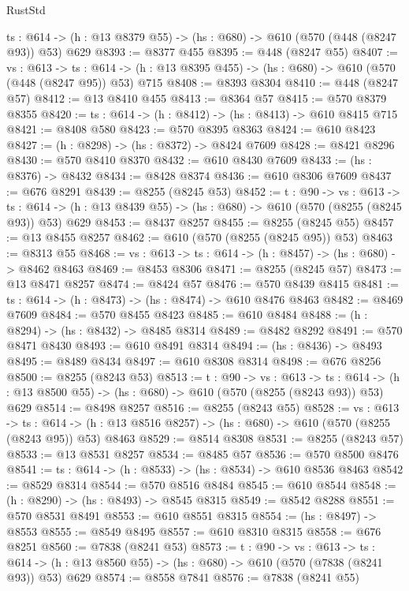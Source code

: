\begin{lexlean}{RustStd}
\begin{coremodule}
  {ts : @614} -> (h : @13 @8379 @55) -> (hs : @680) -> @610 (@570 (@448 (@8247 @93)) @53) @629
@8393 := @8377 @455
@8395 := @448 (@8247 @55)
@8407 := {vs : @613} ->
  {ts : @614} -> (h : @13 @8395 @455) -> (hs : @680) -> @610 (@570 (@448 (@8247 @95)) @53) @715
@8408 := @8393 @8304
@8410 := @448 (@8247 @57)
@8412 := @13 @8410 @455
@8413 := @8364 @57
@8415 := @570 @8379 @8355
@8420 := {ts : @614} -> (h : @8412) -> (hs : @8413) -> @610 @8415 @715
@8421 := @8408 @580
@8423 := @570 @8395 @8363
@8424 := @610 @8423
@8427 := (h : @8298) -> (hs : @8372) -> @8424 @7609
@8428 := @8421 @8296
@8430 := @570 @8410 @8370
@8432 := @610 @8430 @7609
@8433 := (hs : @8376) -> @8432
@8434 := @8428 @8374
@8436 := @610 @8306 @7609
@8437 := @676 @8291
@8439 := @8255 (@8245 @53)
@8452 := {t : @90} ->
  {vs : @613} ->
  {ts : @614} -> (h : @13 @8439 @55) -> (hs : @680) -> @610 (@570 (@8255 (@8245 @93)) @53) @629
@8453 := @8437 @8257
@8455 := @8255 (@8245 @55)
@8457 := @13 @8455 @8257
@8462 := @610 (@570 (@8255 (@8245 @95)) @53)
@8463 := @8313 @55
@8468 := {vs : @613} -> {ts : @614} -> (h : @8457) -> (hs : @680) -> @8462 @8463
@8469 := @8453 @8306
@8471 := @8255 (@8245 @57)
@8473 := @13 @8471 @8257
@8474 := @8424 @57
@8476 := @570 @8439 @8415
@8481 := {ts : @614} -> (h : @8473) -> (hs : @8474) -> @610 @8476 @8463
@8482 := @8469 @7609
@8484 := @570 @8455 @8423
@8485 := @610 @8484
@8488 := (h : @8294) -> (hs : @8432) -> @8485 @8314
@8489 := @8482 @8292
@8491 := @570 @8471 @8430
@8493 := @610 @8491 @8314
@8494 := (hs : @8436) -> @8493
@8495 := @8489 @8434
@8497 := @610 @8308 @8314
@8498 := @676 @8256
@8500 := @8255 (@8243 @53)
@8513 := {t : @90} ->
  {vs : @613} ->
  {ts : @614} -> (h : @13 @8500 @55) -> (hs : @680) -> @610 (@570 (@8255 (@8243 @93)) @53) @629
@8514 := @8498 @8257
@8516 := @8255 (@8243 @55)
@8528 := {vs : @613} ->
  {ts : @614} -> (h : @13 @8516 @8257) -> (hs : @680) -> @610 (@570 (@8255 (@8243 @95)) @53) @8463
@8529 := @8514 @8308
@8531 := @8255 (@8243 @57)
@8533 := @13 @8531 @8257
@8534 := @8485 @57
@8536 := @570 @8500 @8476
@8541 := {ts : @614} -> (h : @8533) -> (hs : @8534) -> @610 @8536 @8463
@8542 := @8529 @8314
@8544 := @570 @8516 @8484
@8545 := @610 @8544
@8548 := (h : @8290) -> (hs : @8493) -> @8545 @8315
@8549 := @8542 @8288
@8551 := @570 @8531 @8491
@8553 := @610 @8551 @8315
@8554 := (hs : @8497) -> @8553
@8555 := @8549 @8495
@8557 := @610 @8310 @8315
@8558 := @676 @8251
@8560 := @7838 (@8241 @53)
@8573 := {t : @90} ->
  {vs : @613} ->
  {ts : @614} -> (h : @13 @8560 @55) -> (hs : @680) -> @610 (@570 (@7838 (@8241 @93)) @53) @629
@8574 := @8558 @7841
@8576 := @7838 (@8241 @55)

\end{coremodule}
\end{lexlean}
